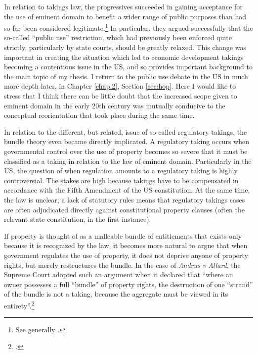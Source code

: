 \documentclass[12pt,a4paper]{book} %
\begin{document}
In relation to takings law, the progressives succeeded in gaining acceptance for the use of eminent domain to benefit a wider range of public purposes than had so far been considered legitimate.\footnote{See generally \cite{yale49}.} In particular, they argued successfully that the so-called ``public use'' restriction, which had previously been enforced quite strictly, particularly by state courts, should be greatly relaxed. This change was important in creating the situation which led to economic development takings becoming a contentious issue in the US, and so provides important background to the main topic of my thesis.  I return to the public use debate in the US in much more depth later, in Chapter \ref{chap:2}, Section \ref{sec:hop}. Here I would like to stress that I think there can be little doubt that the increased scope given to eminent domain in the early 20th century was mutually conducive to the conceptual reorientation that took place during the same time.

In relation to the different, but related, issue of so-called regulatory takings, the bundle theory even  became directly implicated. A regulatory taking occurs when governmental control over the use of property becomes so severe that it must be classified as a taking in relation to the law of eminent domain. Particularly in the US, the question of when regulation amounts to a regulatory taking is highly controversial. The stakes are high because takings have to be compensated in accordance with the Fifth Amendment of the US constitution. At the same time, the law is unclear; a lack of statutory rules means that regulatory takings cases are often adjudicated directly against constitutional property clauses (often the relevant state constitution, in the first instance).

If property is thought of as a malleable bundle of entitlements that exists only because it is recognized by the law, it becomes more natural to argue that when government regulates the use of property, it does not deprive anyone of property rights, but merely restructures the bundle. In the case of {\it Andrus v Allard}, the Supreme Court adopted such an argument when it declared that ``where an owner possesses a full ``bundle'' of property rights, the destruction of one ``strand'' of the bundle is not a taking, because the aggregate must be viewed in its entirety''.\footcite[65--66]{andrus79}
\end{document}

